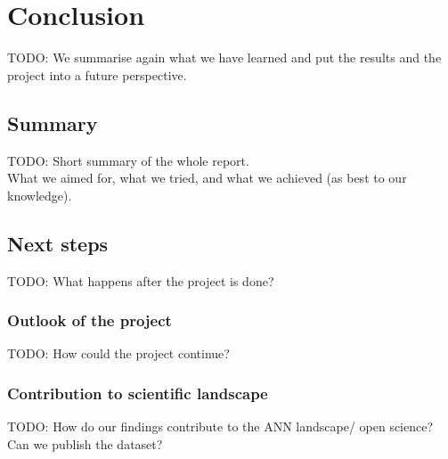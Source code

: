 \section{Conclusion}

TODO: We summarise again what we have learned and put the results and the project into a future perspective.

\subsection{Summary}

TODO: Short summary of the whole report. \\
What we aimed for, what we tried, and what we achieved (as best to our knowledge). \\

\subsection{Next steps}

TODO: What happens after the project is done?

\subsubsection{Outlook of the project}

TODO: How could the project continue? \\

\subsubsection{Contribution to scientific landscape}

TODO: How do our findings contribute to the ANN landscape/ open science?
Can we publish the dataset?

